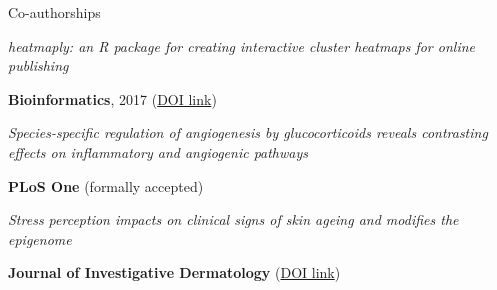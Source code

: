 


\begin{cventries}


\cventry
{Co-authorships} %
{} %
{} %
{} %
{ %
    \begin{cvitems}
        \item {
            \begin{flushleft}
                \textit{heatmaply: an R package for creating interactive cluster heatmaps for online publishing}
            \end{flushleft}
            \textbf{Bioinformatics}, 2017 
            (\href{https://doi.org/10.1093/bioinformatics/btx657}{DOI link})
        }
        \item {
            \begin{flushleft}\textit{Species-specific regulation of angiogenesis by glucocorticoids reveals contrasting effects on inflammatory and angiogenic pathways} 
            \end{flushleft}
            \textbf{PLoS One} (formally accepted)}
        \item {
            \begin{flushleft}
                    \textit{Stress perception impacts on clinical signs of skin ageing and modifies the epigenome} 
            \end{flushleft}
            \textbf{Journal of Investigative Dermatology} 
            (\href{http://dx.doi.org/10.1016/j.jid.2016.06.079}{DOI link})}
    \end{cvitems}
}


\end{cventries}
